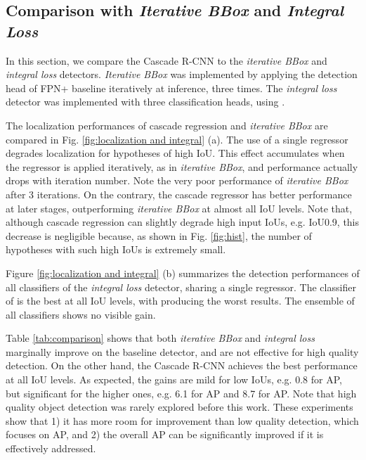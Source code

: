 \documentclass[10pt,journal,compsoc]{IEEEtran}
\begin{document}
\subsection{Comparison with \textit{Iterative BBox} and \textit{Integral Loss}}

In this section, we compare the Cascade R-CNN to
the \textit{iterative BBox} and \textit{integral loss} detectors.
\textit{Iterative BBox} was implemented by applying the detection head of FPN+ baseline
iteratively at inference, three times. The \textit{integral loss} detector was implemented
with three classification heads, using .

\vspace{0.2cm}
The localization performances of cascade regression
and \textit{iterative BBox} are compared in
Fig. \ref{fig:localization and integral} (a). The use of a single
regressor degrades localization for hypotheses of high IoU. This effect
accumulates when the regressor is applied iteratively, as
in \textit{iterative BBox}, and performance actually drops with
iteration number. Note the very poor performance of \textit{iterative BBox}
after 3 iterations. On the contrary, the cascade regressor has better
performance at later stages, outperforming \textit{iterative BBox} at almost
all IoU levels. Note that, although cascade regression can slightly
degrade high input IoUs, e.g. IoU0.9, this decrease is
negligible because, as shown in Fig. \ref{fig:hist}, the number of
hypotheses with such high IoUs is extremely small.

\vspace{0.2cm}
 Figure \ref{fig:localization and integral} (b)
summarizes the detection performances of all classifiers
of the \textit{integral loss} detector, sharing a single regressor.
The classifier of  is the best at all IoU levels, with 
producing the worst results. The ensemble of all classifiers shows no
visible gain.

Table \ref{tab:comparison} shows that both
\textit{iterative BBox} and \textit{integral loss} marginally
improve on the baseline detector, and are not effective for
high quality detection. On the other hand, the Cascade R-CNN
achieves the best performance at all IoU levels. As expected, the gains are
mild for low IoUs, e.g. 0.8 for AP, but significant for the
higher ones, e.g. 6.1 for AP and 8.7 for AP. Note that
high quality object detection was rarely explored before
this work. These experiments show that 1) it has more room for improvement than
low quality detection, which focuses on AP, and 2) the overall AP can be
significantly improved if it is effectively addressed.
\end{document}
